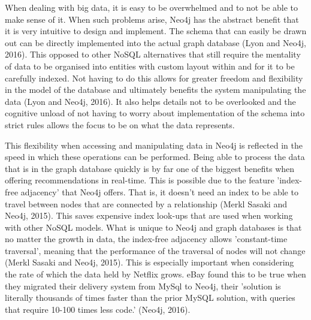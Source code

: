 \documentclass[a4paper]{article}
\begin{document}
When dealing with big data, it is easy to be overwhelmed and to not be able to make sense of it. When such problems arise, Neo4j has the abstract benefit that it is very intuitive to design and implement. The schema that can easily be drawn out can be directly implemented into the actual graph database (Lyon and Neo4j, 2016). This opposed to other NoSQL alternatives that still require the mentality of data to be organised into entities with custom layout within and for it to be carefully indexed. Not having to do this allows for greater freedom and flexibility in the model of the database and ultimately benefits the system manipulating the data (Lyon and Neo4j, 2016). It also helps details not to be overlooked and the cognitive unload of not having to worry about implementation of the schema into strict rules allows the focus to be on what the data represents.\par

This flexibility when accessing and manipulating data in Neo4j is reflected in the speed in which these operations can be performed. Being able to process the data that is in the graph database quickly is by far one of the biggest benefits when offering recommendations in real-time. This is possible due to the feature 'index-free adjacency' that Neo4j offers. That is, it doesn't need an index to be able to travel between nodes that are connected by a relationship (Merkl Sasaki and Neo4j, 2015). This saves expensive index look-ups that are used when working with other NoSQL models. What is unique to Neo4j and graph databases is that no matter the growth in data, the index-free adjacency allows 'constant-time traversal', meaning that the performance of the traversal of nodes will not change (Merkl Sasaki and Neo4j, 2015). This is especially important when considering the rate of which the data held by Netflix grows. eBay found this to be true when they migrated their delivery system from MySql to Neo4j, their 'solution is literally thousands of times faster than the prior MySQL solution, with queries that require 10-100 times less code.' (Neo4j, 2016). \par
\end{document}
